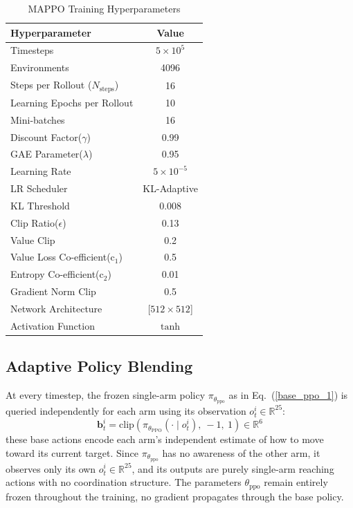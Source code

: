 \documentclass[lettersize,journal]{IEEEtran}
\begin{document}
\begin{table}[h]
\caption{MAPPO Training Hyperparameters}
\centering
\begin{tabular}{lc}
\midrule 
\textbf{Hyperparameter} & \textbf{Value} \\
\midrule \midrule
Timesteps  & $5 \times 10^{5}$\\
Environments & 4096 \\
Steps per Rollout ($N_{\text{steps}}$) & 16 \\
Learning Epochs per Rollout & 10 \\
Mini-batches& 16 \\
Discount Factor($\gamma$) & 0.99 \\
GAE Parameter($\lambda$) & 0.95 \\
Learning Rate & $5 \times 10^{-5}$ \\
LR Scheduler & KL-Adaptive \\
KL Threshold & 0.008 \\
Clip Ratio($\epsilon$) & 0.13\\
Value Clip & 0.2\\
Value Loss Co-efficient($\text{c}_1$) & 0.5\\
Entropy Co-efficient($\text{c}_2$) & 0.01\\
Gradient Norm Clip & 0.5\\
Network Architecture & [$512 \times 512$]\\
Activation Function & $\tanh$\\
\bottomrule
\end{tabular}
\label{tab:mappo_hyperparameters}
\end{table}
\subsection{Adaptive Policy Blending}
\label{HR_blending}
At every timestep, the frozen single-arm policy $\pi_{\theta_{\text{ppo}}}$ as in Eq.~(\ref{base_ppo_1}) is queried independently for each arm using its observation $o_t^i \in \mathbb{R}^{25}$:
\begin{equation}
\mathbf{b}_t^i = \mathrm{clip}\left( \pi_{\theta_{\text{PPO}}}(\cdot \mid o_t^i),\ -1,\ 1 \right) \in \mathbb{R}^6
\label{base_ppo_1}
\end{equation}
these base actions encode each arm's independent estimate of how to move toward its current target. Since $\pi_{\theta_{\text{ppo}}}$ has no awareness of the other arm, it observes only its own $o_t^i \in \mathbb{R}^{25}$, and its outputs are purely single-arm reaching actions with no coordination structure. The parameters $\theta_{\text{ppo}}$ remain entirely frozen throughout the training, no gradient propagates through the base policy.
\end{document}
